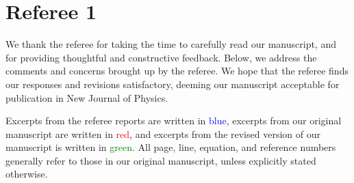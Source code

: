 \documentclass[preprint]{revtex4-1}
\newcommand{\1}{\mathds{1}}
\newcommand{\blue}[1]{\textcolor{blue}{#1}}
\newcommand{\red}[1]{\textcolor{red}{#1}}
\newcommand{\green}[1]{\textcolor{green}{#1}}
\begin{document}
\section*{Referee 1}

We thank the referee for taking the time to carefully read our
manuscript, and for providing thoughtful and constructive feedback.
Below, we address the comments and concerns brought up by the referee.
We hope that the referee finds our responses and revisions
satisfactory, deeming our manuscript acceptable for publication in New
Journal of Physics.

Excerpts from the referee reports are written in \blue{blue}, excerpts
from our original manuscript are written in \red{red}, and excerpts
from the revised version of our manuscript is written in
\green{green}.  All page, line, equation, and reference numbers
generally refer to those in our original manuscript, unless explicitly
stated otherwise.
\end{document}

